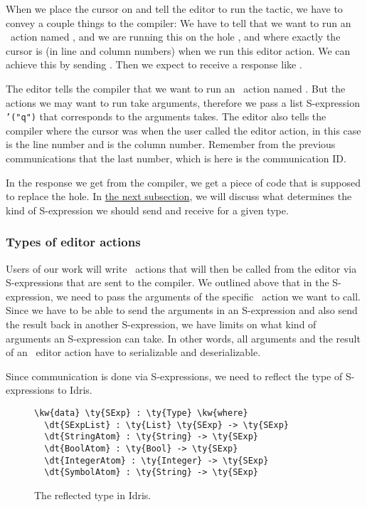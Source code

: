 When we place the cursor on  and tell the editor to run the 
tactic, we have to convey a couple things to the compiler: We have to tell that
we want to run an \Elab\ action named , and we are running this on
the hole , and where exactly the cursor is (in line and column numbers)
when we run this editor action.
We can achieve this by sending .
Then we expect to receive a response like .

The editor tells the compiler that we want to run an \Elab\ action named
. But the actions we may want to run take arguments, therefore we
pass a list S-expression \texttt{'("q")} that corresponds to the arguments
 takes. The editor also tells the compiler where the cursor was when
the user called the editor action, in this case  is the line number and
 is the column number. Remember from the previous communications that the
last number, which is  here is the communication ID.

In the response we get from the compiler, we get a piece of code that is
supposed to replace the hole. In \hyperref[sec:types]{the next subsection}, we
will discuss what determines the kind of S-expression we should send and
receive for a given type.

\subsubsection{Types of editor actions}\label{sec:types}

Users of our work will write \Elab\ actions that will then be called from the
editor via S-expressions that are sent to the compiler. We outlined above that
in the S-expression, we need to pass the arguments of the specific
\Elab\ action we want to call. Since we have to be able to send the arguments
in an S-expression and also send the result back in another S-expression, we
have limits on what kind of arguments an S-expression can take.
In other words, all arguments and the result of an \Elab\ editor action
have to serializable and deserializable.

Since communication is done via S-expressions, we need to reflect the type of
\mbox{S-expressions} to Idris.

\begin{figure}[H]
\begin{Verbatim}
\kw{data} \ty{SExp} : \ty{Type} \kw{where}
  \dt{SExpList} : \ty{List} \ty{SExp} -> \ty{SExp}
  \dt{StringAtom} : \ty{String} -> \ty{SExp}
  \dt{BoolAtom} : \ty{Bool} -> \ty{SExp}
  \dt{IntegerAtom} : \ty{Integer} -> \ty{SExp}
  \dt{SymbolAtom} : \ty{String} -> \ty{SExp}
\end{Verbatim}
\caption{The reflected type  in Idris.}
\label{code:definitionSExp}
\end{figure}

